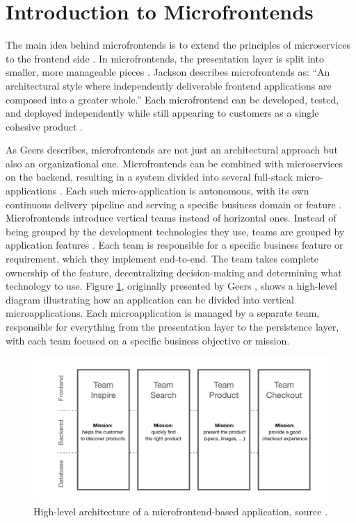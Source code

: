 \section{Introduction to Microfrontends}  
The main idea behind microfrontends is to extend the principles of microservices to the frontend side \cite{Montelius, Geers}. In microfrontends, the presentation layer is split into smaller, more manageable pieces \cite{Montelius}. Jackson \cite{Jackson} describes microfrontends as: ``An architectural style where independently deliverable frontend applications are composed into a greater whole.'' Each microfrontend can be developed, tested, and deployed independently while still appearing to customers as a single cohesive product \cite{Jackson}.

As Geers \cite{Geers} describes, microfrontends are not just an architectural approach but also an organizational one. Microfrontends can be combined with microservices on the backend, resulting in a system divided into several full-stack micro-applications \cite{Montelius}. Each such micro-application is autonomous, with its own continuous delivery pipeline and serving a specific business domain or feature \cite{Peltonen}. Microfrontends introduce vertical teams instead of horizontal ones. Instead of being grouped by the development technologies they use, teams are grouped by application features \cite{Montelius}. Each team is responsible for a specific business feature or requirement, which they implement end-to-end. The team takes complete ownership of the feature, decentralizing decision-making and determining what technology to use. Figure \ref{fig:microfrontends-architecture}, originally presented by Geers \cite{GeersWeb}, shows a high-level diagram illustrating how an application can be divided into vertical microapplications. Each microapplication is managed by a separate team, responsible for everything from the presentation layer to the persistence layer, with each team focused on a specific business objective or mission.
\begin{figure}[h]  
  \centerline{\includegraphics[width=1\textwidth]{images/microfrontends-architecture.png}}  
  \caption[Microfrontend Architecture]{High-level architecture of a microfrontend-based application, source \cite{GeersWeb}.}  
  \label{fig:microfrontends-architecture}  
\end{figure}